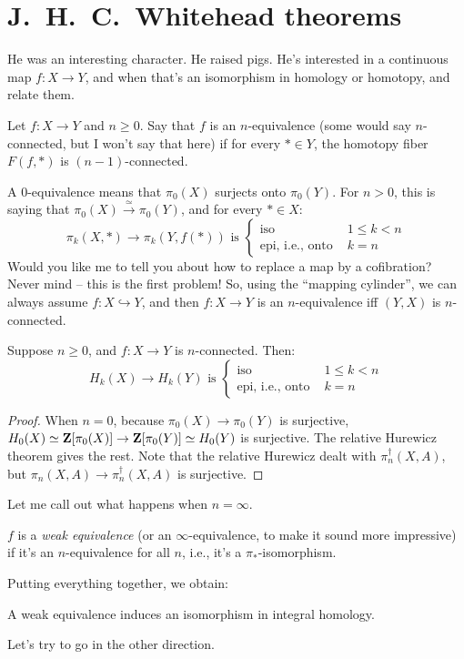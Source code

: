 \section{J.~H.~C.~Whitehead theorems}
He was an interesting character. He raised pigs. He's interested in a continuous map $f:X\to Y$, and when that's an isomorphism in homology or homotopy, and relate them.
\begin{definition}
    Let $f:X\to Y$ and $n\geq 0$. Say that $f$ is an $n$-equivalence (some would say $n$-connected, but I won't say that here) if for every $\ast\in Y$, the homotopy fiber $F(f,\ast)$ is $(n-1)$-connected.
\end{definition}
A $0$-equivalence means that $\pi_0(X)$ surjects onto $\pi_0(Y)$. For $n>0$, this is saying that $\pi_0(X)\xrightarrow{\simeq}\pi_0(Y)$, and for every $\ast\in X$:
\begin{equation*}
    \pi_k(X,\ast)\to\pi_k(Y,f(\ast)) \text{ is }\begin{cases}
	\text{iso } & 1\leq k<n\\
	\text{epi, i.e., onto } & k = n
    \end{cases}
\end{equation*}
Would you like me to tell you about how to replace a map by a cofibration? Never mind -- this is the first problem! So, using the ``mapping cylinder'', we can always assume $f:X\hookrightarrow Y$, and then $f:X\to Y$ is an $n$-equivalence iff $(Y,X)$ is $n$-connected.
\begin{theorem}[J.~H.~C.~Whitehead 1]
    Suppose $n\geq 0$, and $f:X\to Y$ is $n$-connected. Then:
\begin{equation*}
H_k(X)\to H_k(Y) \text{ is }\begin{cases}
\text{iso } & 1\leq k<n\\
\text{epi, i.e., onto } & k = n
\end{cases}
\end{equation*}
\end{theorem}
\begin{proof}
    When $n=0$, because $\pi_0(X)\to \pi_0(Y)$ is surjective, $H_0(X)\simeq \mathbf Z[\pi_0(X)]\to \mathbf Z[\pi_0(Y)]\simeq H_0(Y)$ is surjective. The relative Hurewicz theorem gives the rest. Note that the relative Hurewicz dealt with $\pi_n^\dagger(X,A)$, but $\pi_n(X,A)\to\pi_n^\dagger(X,A)$ is surjective.
\end{proof}
Let me call out what happens when $n=\infty$.
\begin{definition}
    $f$ is a \emph{weak equivalence} (or an $\infty$-equivalence, to make it sound more impressive) if it's an $n$-equivalence for all $n$, i.e., it's a $\pi_\ast$-isomorphism.
\end{definition}
Putting everything together, we obtain:
\begin{corollary}
    A weak equivalence induces an isomorphism in integral homology.
\end{corollary}
Let's try to go in the other direction.

